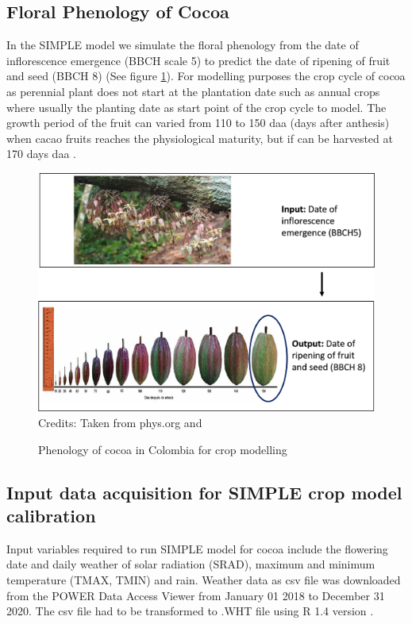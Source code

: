 \documentclass[gene,journal,article,submit,moreauthors,pdftex]{Definitions/mdpi}
\begin{document}
\subsection{Floral Phenology of Cocoa }
In the SIMPLE model we simulate the floral phenology from the date of inflorescence emergence (BBCH scale 5) to predict the date of ripening of fruit and seed (BBCH 8) \citep{Niemenak2010} (See figure \ref{fig:pheno}). For modelling purposes the crop cycle of cocoa as perennial plant does not start at the plantation date such as annual crops where usually the planting date as start point of the crop cycle to model. The growth period of the fruit can varied from  110 to 150  daa (days after anthesis) \citep{lopez2018} when cacao fruits reaches the physiological maturity, but if can be harvested at 170 days daa \citep{Niemenak2010}. 

 
\begin{figure}[h]
	\centering
	\caption{\footnotesize {Phenology of cocoa in Colombia for crop modelling\\}} 
	\includegraphics[scale=0.5]{images/phenology.png}\\
	\footnotesize{Credits: Taken from phys.org \citep{toledo2021} and \cite{lopez2018}}
	\label{fig:pheno}
\end{figure}
\newpage

\subsection{Input data acquisition for SIMPLE crop model calibration}
Input variables required to run SIMPLE model for cocoa include the flowering date and daily weather of solar radiation (SRAD), maximum and minimum temperature (TMAX, TMIN) and rain. Weather data as csv file was  downloaded from the POWER Data Access Viewer \citep{nasapower} from January 01 2018 to December 31 2020. The csv file had to be transformed to .WHT file using R 1.4 version \citep{Rstudio2020}. 
\end{document}
